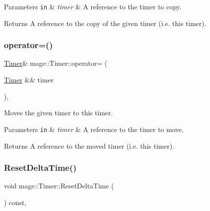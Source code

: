 \begin{DoxyParams}[1]{Parameters}
\mbox{\tt in}  & {\em timer} & A reference to the timer to copy. \\
\hline
\end{DoxyParams}
\begin{DoxyReturn}{Returns}
A reference to the copy of the given timer (i.\+e. this timer). 
\end{DoxyReturn}
\hypertarget{classmage_1_1_timer_a38d7c1fe4c4061c56286183032dc67d8}{}\label{classmage_1_1_timer_a38d7c1fe4c4061c56286183032dc67d8} 
\subsubsection{\texorpdfstring{operator=()}{operator=()}\hspace{0.1cm}{\footnotesize\ttfamily [2/2]}}
{\footnotesize\ttfamily \hyperlink{classmage_1_1_timer}{Timer}\& mage\+::\+Timer\+::operator= (\begin{DoxyParamCaption}\item[{\hyperlink{classmage_1_1_timer}{Timer} \&\&}]{timer }\end{DoxyParamCaption})\hspace{0.3cm}{\ttfamily [default]}, {\ttfamily [noexcept]}}

Moves the given timer to this timer.


\begin{DoxyParams}[1]{Parameters}
\mbox{\tt in}  & {\em timer} & A reference to the timer to move. \\
\hline
\end{DoxyParams}
\begin{DoxyReturn}{Returns}
A reference to the moved timer (i.\+e. this timer). 
\end{DoxyReturn}
\hypertarget{classmage_1_1_timer_a5b66b3bfbed7cd4a3ad565abec5c3b02}{}\label{classmage_1_1_timer_a5b66b3bfbed7cd4a3ad565abec5c3b02} 
\subsubsection{\texorpdfstring{Reset\+Delta\+Time()}{ResetDeltaTime()}}
{\footnotesize\ttfamily void mage\+::\+Timer\+::\+Reset\+Delta\+Time (\begin{DoxyParamCaption}{ }\end{DoxyParamCaption}) const\hspace{0.3cm}{\ttfamily [private]}, {\ttfamily [noexcept]}}


